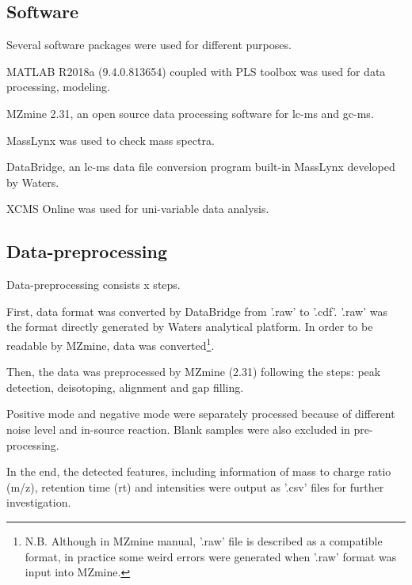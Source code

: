 \subsection{Software}
Several software packages were used for different purposes.

MATLAB R2018a (9.4.0.813654) coupled with PLS toolbox was used for data processing, modeling.

MZmine 2.31, an open source data processing software for \acrshort{lc-ms} and \acrshort{gc-ms}. 

MassLynx was used to check mass spectra.

DataBridge, an \acrshort{lc-ms} data file conversion program built-in MassLynx developed by Waters.

XCMS Online was used for uni-variable data analysis.


\subsection{Data-preprocessing}
Data-preprocessing consists x steps.

First, data format was converted by DataBridge from '.raw' to '.cdf'. '.raw' was the format directly generated by Waters analytical platform. In order to be readable by MZmine, data was converted\footnote{N.B. Although in MZmine manual, '.raw' file is described as a compatible format, in practice some weird errors were generated when '.raw' format was input into MZmine.}.

Then, the data was preprocessed by MZmine (2.31) following the steps: peak detection, deisotoping, alignment and gap filling.

Positive mode and negative mode were separately processed because of different noise level and in-source reaction. Blank samples were also excluded in pre-processing.

In the end, the detected features, including information of mass to charge ratio (m/z), retention time (rt) and intensities were output as '.csv' files for further investigation.


